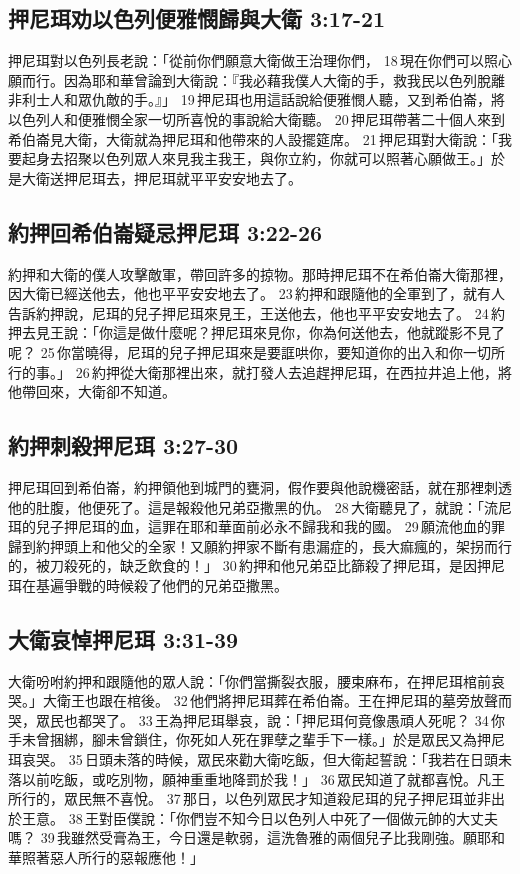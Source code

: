 \subsection{押尼珥劝以色列便雅憫歸與大衛 3:17-21}
押尼珥對以色列長老說：「從前你們願意大衛做王治理你們， 18 現在你們可以照心願而行。因為耶和華曾論到大衛說：『我必藉我僕人大衛的手，救我民以色列脫離非利士人和眾仇敵的手。』」 19 押尼珥也用這話說給便雅憫人聽，又到希伯崙，將以色列人和便雅憫全家一切所喜悅的事說給大衛聽。 20 押尼珥帶著二十個人來到希伯崙見大衛，大衛就為押尼珥和他帶來的人設擺筵席。 21 押尼珥對大衛說：「我要起身去招聚以色列眾人來見我主我王，與你立約，你就可以照著心願做王。」於是大衛送押尼珥去，押尼珥就平平安安地去了。

\subsection{約押回希伯崙疑忌押尼珥 3:22-26}
約押和大衛的僕人攻擊敵軍，帶回許多的掠物。那時押尼珥不在希伯崙大衛那裡，因大衛已經送他去，他也平平安安地去了。 23 約押和跟隨他的全軍到了，就有人告訴約押說，尼珥的兒子押尼珥來見王，王送他去，他也平平安安地去了。 24 約押去見王說：「你這是做什麼呢？押尼珥來見你，你為何送他去，他就蹤影不見了呢？ 25 你當曉得，尼珥的兒子押尼珥來是要誆哄你，要知道你的出入和你一切所行的事。」 26 約押從大衛那裡出來，就打發人去追趕押尼珥，在西拉井追上他，將他帶回來，大衛卻不知道。

\subsection{約押刺殺押尼珥 3:27-30}
押尼珥回到希伯崙，約押領他到城門的甕洞，假作要與他說機密話，就在那裡刺透他的肚腹，他便死了。這是報殺他兄弟亞撒黑的仇。 28 大衛聽見了，就說：「流尼珥的兒子押尼珥的血，這罪在耶和華面前必永不歸我和我的國。 29 願流他血的罪歸到約押頭上和他父的全家！又願約押家不斷有患漏症的，長大痲瘋的，架拐而行的，被刀殺死的，缺乏飲食的！」 30 約押和他兄弟亞比篩殺了押尼珥，是因押尼珥在基遍爭戰的時候殺了他們的兄弟亞撒黑。

\subsection{大衛哀悼押尼珥 3:31-39}
大衛吩咐約押和跟隨他的眾人說：「你們當撕裂衣服，腰束麻布，在押尼珥棺前哀哭。」大衛王也跟在棺後。 32 他們將押尼珥葬在希伯崙。王在押尼珥的墓旁放聲而哭，眾民也都哭了。 33 王為押尼珥舉哀，說：「押尼珥何竟像愚頑人死呢？ 34 你手未曾捆綁，腳未曾鎖住，你死如人死在罪孽之輩手下一樣。」於是眾民又為押尼珥哀哭。 35 日頭未落的時候，眾民來勸大衛吃飯，但大衛起誓說：「我若在日頭未落以前吃飯，或吃別物，願神重重地降罰於我！」 36 眾民知道了就都喜悅。凡王所行的，眾民無不喜悅。 37 那日，以色列眾民才知道殺尼珥的兒子押尼珥並非出於王意。 38 王對臣僕說：「你們豈不知今日以色列人中死了一個做元帥的大丈夫嗎？ 39 我雖然受膏為王，今日還是軟弱，這洗魯雅的兩個兒子比我剛強。願耶和華照著惡人所行的惡報應他！」


